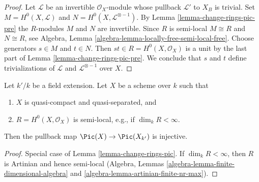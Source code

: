 \begin{proof}
Let $\mathcal{L}$ be an invertible $\mathcal{O}_X$-module
whose pullback $\mathcal{L}'$ to $X_B$ is trivial.
Set $M = H^0(X, \mathcal{L})$ and $N = H^0(X, \mathcal{L}^{\otimes - 1})$.
By Lemma \ref{lemma-change-rings-pic-pre} the $R$-modules $M$ and $N$ are
invertible. Since $R$ is semi-local $M \cong R$ and $N \cong R$, see
Algebra, Lemma \ref{algebra-lemma-locally-free-semi-local-free}.
Choose generators $s \in M$ and $t \in N$. Then
$st \in R = H^0(X, \mathcal{O}_X)$ is a unit by the last part
of Lemma \ref{lemma-change-rings-pic-pre}.
We conclude that $s$ and $t$ define trivializations of $\mathcal{L}$ and
$\mathcal{L}^{\otimes -1}$ over $X$.
\end{proof}

\begin{lemma}
\label{lemma-change-fields-pic}
Let $k'/k$ be a field extension.
Let $X$ be a scheme over $k$ such that
\begin{enumerate}
\item $X$ is quasi-compact and quasi-separated, and
\item $R = H^0(X, \mathcal{O}_X)$ is semi-local, e.g., if $\dim_k R < \infty$.
\end{enumerate}
Then the pullback map $\Pic(X) \to \Pic(X_{k'})$ is injective.
\end{lemma}

\begin{proof}
Special case of Lemma \ref{lemma-change-rings-pic}.
If $\dim_k R < \infty$, then
$R$ is Artinian and hence semi-local (Algebra, Lemmas
\ref{algebra-lemma-finite-dimensional-algebra} and
\ref{algebra-lemma-artinian-finite-nr-max}).
\end{proof}

